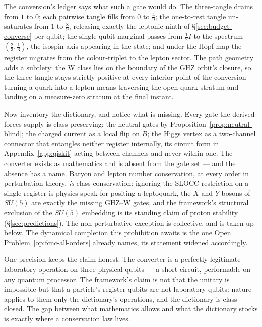 The conversion's ledger says what such a gate would do. The three-tangle drains from $1$ to $0$;
each pairwise tangle fills from $0$ to $\tfrac49$; the one-to-rest tangle un-saturates from $1$ to
$\tfrac89$, releasing exactly the leptonic ninth of \S\ref{sec:budget-converse} per qubit; the
single-qubit marginal passes from $\tfrac12 I$ to the spectrum $(\tfrac23, \tfrac13)$, the
isospin axis appearing in the state; and under the Hopf map the register migrates from the
colour-triplet to the lepton sector. The path geometry adds a subtlety: the W class lies on the
boundary of the GHZ orbit's closure, so the three-tangle stays strictly positive at every interior
point of the conversion --- turning a quark into a lepton means traversing the open quark stratum
and landing on a measure-zero stratum at the final instant.

Now inventory the dictionary, and notice what is missing. Every gate the derived forces supply is
class-preserving: the neutral gates by Proposition~\ref{prop:neutral-blind}; the charged current
as a local flip on $B$; the Higgs vertex as a two-channel connector that entangles neither register
internally, its circuit form in Appendix~\ref{app:qiskit} acting between channels and never within
one. The converter exists as mathematics and is absent from the gate set --- and the absence has a
name. Baryon and lepton number conservation, at every order in perturbation theory, \emph{is} class
conservation: ignoring the SLOCC restriction on a single register is physics-speak for positing a
leptoquark, the $X$ and $Y$ bosons of $SU(5)$ are exactly the missing GHZ--W gates, and the
framework's structural exclusion of the $SU(5)$ embedding is its standing claim of proton
stability (\S\ref{sec:predictions}). The non-perturbative exception is collective, and is taken
up below. The dynamical completion
this prohibition awaits is the one Open Problem~\ref{op:fcnc-all-orders} already names, its
statement widened accordingly.

One precision keeps the claim honest. The converter is a perfectly legitimate laboratory operation
on three physical qubits --- a short circuit, performable on any quantum processor. The framework's
claim is not that the unitary is impossible but that a particle's register qubits are not
laboratory qubits: nature applies to them only the dictionary's operations, and the dictionary is
class-closed. The gap between what mathematics allows and what the dictionary stocks is exactly where a conservation law lives.

